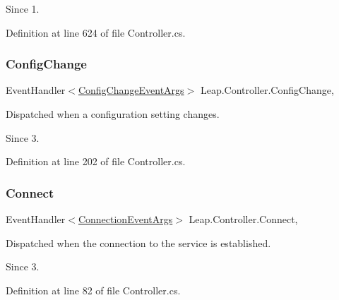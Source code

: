 \begin{DoxySince}{Since}
1. 
\end{DoxySince}


Definition at line 624 of file Controller.\+cs.

\mbox{\label{class_leap_1_1_controller_aa95b8d42774232245cd10c23d90d0343}} 
\subsubsection{\texorpdfstring{ConfigChange}{ConfigChange}}
{\footnotesize\ttfamily Event\+Handler$<$\mbox{\hyperlink{class_leap_1_1_config_change_event_args}{Config\+Change\+Event\+Args}}$>$ Leap.\+Controller.\+Config\+Change\hspace{0.3cm}{\ttfamily [add]}, {\ttfamily [remove]}}



Dispatched when a configuration setting changes. 

\begin{DoxySince}{Since}
3. 
\end{DoxySince}


Definition at line 202 of file Controller.\+cs.

\mbox{\label{class_leap_1_1_controller_abc23a30fb9ef4327ab4c12dc90698f14}} 
\subsubsection{\texorpdfstring{Connect}{Connect}}
{\footnotesize\ttfamily Event\+Handler$<$\mbox{\hyperlink{class_leap_1_1_connection_event_args}{Connection\+Event\+Args}}$>$ Leap.\+Controller.\+Connect\hspace{0.3cm}{\ttfamily [add]}, {\ttfamily [remove]}}



Dispatched when the connection to the service is established. 

\begin{DoxySince}{Since}
3. 
\end{DoxySince}


Definition at line 82 of file Controller.\+cs.

